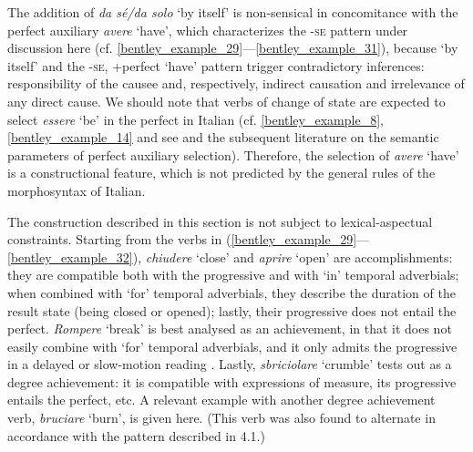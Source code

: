 \documentclass[output=paper,colorlinks,citecolor=brown
]{langscibook}
\begin{document}
The addition of\textit{ da sé/da solo} ‘by itself’ is non-sensical in concomitance with the perfect
auxiliary \textit{avere} ‘have’, which characterizes the -\textsc{se} pattern under discussion here
(cf. \ref{bentley_example_29}—\ref{bentley_example_31}), because ‘by itself’ and the {-\textsc{se}, +perfect ‘have’} pattern trigger contradictory inferences: responsibility of the causee and, respectively, indirect causation and irrelevance of any direct cause. We should note that verbs of change of state are expected to select \textit{essere} ‘be’ in the perfect in Italian (cf. \ref{bentley_example_8}, \ref{bentley_example_14} and see \cite{perlmutter1989multiattachment} and the subsequent literature on the semantic parameters of perfect auxiliary selection). Therefore, the selection of \textit{avere }‘have’ is a constructional feature, which is not predicted by the general rules of the morphosyntax of Italian.

The construction described in this section is not subject to lexical-aspectual constraints. Starting from the verbs in (\ref{bentley_example_29}—\ref{bentley_example_32}), \textit{chiudere} ‘close’ and \textit{aprire} ‘open’ are accomplishments: they are compatible both with the progressive and with ‘in’ temporal adverbials; when combined with ‘for’ temporal adverbials, they describe the duration of the result state (being closed or opened); lastly, their progressive does not entail the perfect. \textit{Rompere} ‘break’ is best analysed as an achievement, in that it does not easily combine with ‘for’ temporal adverbials, and it only admits the progressive in a delayed or slow-motion reading \citep{bertinetto2016tense,vivanco2021scalar}. Lastly, \textit{sbriciolare} ‘crumble’ tests out as a degree achievement: it is compatible with expressions of measure, its progressive entails the perfect, etc. A relevant example with another degree achievement verb, \textit{bruciare} ‘burn’, is given here. (This verb was also found to alternate in accordance with the pattern described in 4.1.)
\end{document}

